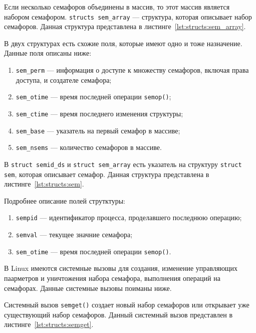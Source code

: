 

Если несколько семафоров объединены в массив, то этот массив является набором семафором. 
\texttt{structs sem\_array} --- структура, которая описывает набор семафоров. Данная структура представлена в листинге~\ref{lst:structs:sem_array}.



В двух структурах есть схожие поля, которые имеют одно и тоже назначение. Данные поля описаны ниже:
\begin{enumerate}
	\item \texttt{sem\_perm} --- информация о доступе к множеству семафоров, включая права доступа, и создателе семафора;
	\item \texttt{sem\_otime} --- время последней операции \texttt{semop()};
	\item \texttt{sem\_ctime} --- время последнего изменения структуры;
	\item \texttt{sem\_base} --- указатель на первый семафор в массиве;
	\item \texttt{sem\_nsems} --- количество семафоров в массиве.
\end{enumerate}


В \texttt{struct semid\_ds} и \texttt{struct sem\_array} есть указатель на структуру \texttt{struct sem}, которая описывает семафор. Данная структура представлена в листинге~\ref{lst:structs:sem}.



Подробнее описание полей струтктуры:
\begin{enumerate}
	\item \texttt{sempid} --- идентификатор процесса, проделавшего последнюю операцию;
	\item \texttt{semval} --- текущее значние семафора;
	\item \texttt{sem\_otime} --- время последней операции \texttt{semop()}.
\end{enumerate}

В Linux имеются системные вызовы для создания, изменение управляющих паарметров и уничтожения набора семафора, выполнения операций на семафорах. Данные системные вызовы поиманы ниже.

Системный вызов \texttt{semget()} создает новый набор семафоров или открывает уже существующий набор семафоров. Данный системный вызов представлен в листинге~\ref{lst:structs:semget}.

